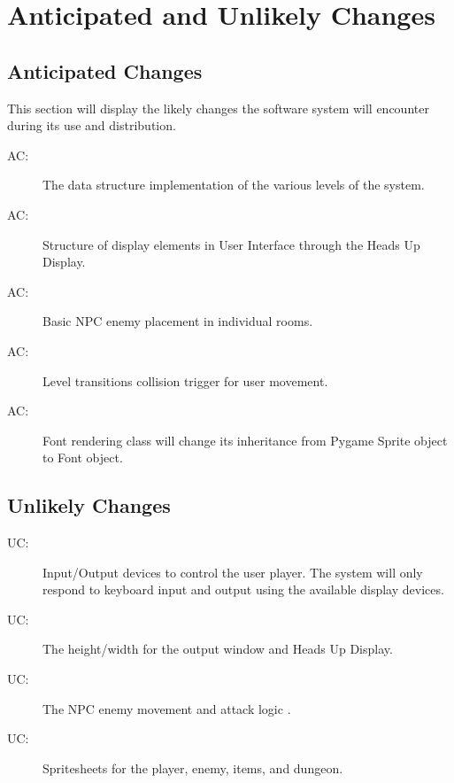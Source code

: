 \documentclass[12pt, titlepage]{article}
\newcounter{acnum}
\newcommand{\actheacnum}{AC\theacnum}
\newcounter{ucnum}
\newcommand{\uctheucnum}{UC\theucnum}
\begin{document}
\section{Anticipated and Unlikely Changes} \label{SecChange}

\subsection{Anticipated Changes} \label{SecAchange}
This section will display the likely changes the software system will encounter during its use and distribution.

\begin{description}
    \item[ \actheacnum \label{AC1}:] The data structure implementation of the various levels of the system.
    \item[ \actheacnum \label{AC2}:] Structure of display elements in User Interface through the Heads Up Display.
    \item[ \actheacnum \label{AC3}:] Basic NPC enemy placement in individual rooms.
    \item[ \actheacnum \label{AC4}:] Level transitions collision trigger for user movement.
    \item[ \actheacnum \label{AC5}:] Font rendering class will change its inheritance from Pygame Sprite object to Font object.
\end{description}

\subsection{Unlikely Changes} \label{SecUchange}

\begin{description}
\item[ \uctheucnum \label{UC1}:] Input/Output devices to control the user player. The system will only respond to keyboard input and output using the available display devices.
\item[ \uctheucnum \label{UC2}:] The height/width for the output window and Heads Up Display.
\item[ \uctheucnum \label{UC3}:] The NPC enemy movement and attack logic .
\item[ \uctheucnum \label{UC4}:] Spritesheets for the player, enemy, items, and dungeon. 
\end{description}
\end{document}
